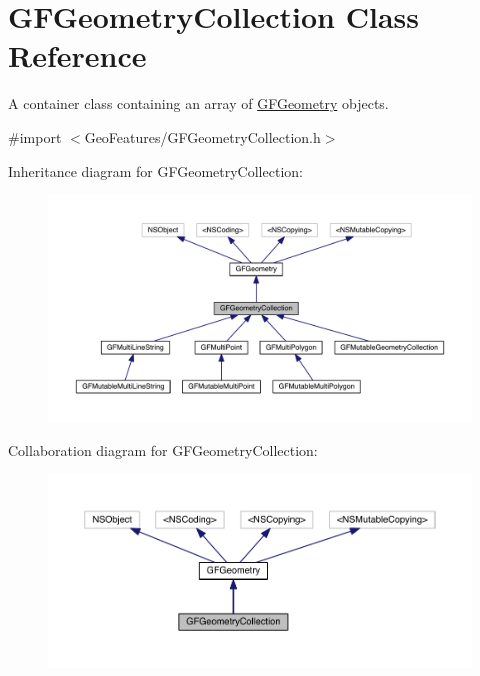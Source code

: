 \hypertarget{interface_g_f_geometry_collection}{}\section{G\+F\+Geometry\+Collection Class Reference}
\label{interface_g_f_geometry_collection}


A container class containing an array of \hyperlink{interface_g_f_geometry}{G\+F\+Geometry} objects.  




{\ttfamily \#import $<$Geo\+Features/\+G\+F\+Geometry\+Collection.\+h$>$}



Inheritance diagram for G\+F\+Geometry\+Collection\+:
\nopagebreak
\begin{figure}[H]
\begin{center}
\leavevmode
\includegraphics[width=350pt]{interface_g_f_geometry_collection__inherit__graph}
\end{center}
\end{figure}


Collaboration diagram for G\+F\+Geometry\+Collection\+:
\nopagebreak
\begin{figure}[H]
\begin{center}
\leavevmode
\includegraphics[width=350pt]{interface_g_f_geometry_collection__coll__graph}
\end{center}
\end{figure}
